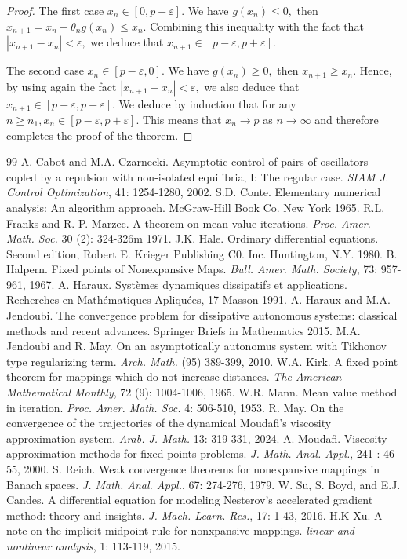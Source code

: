 \documentclass[11pt]{amsart}%
\theoremstyle{plain}
\numberwithin{equation}{section}
\begin{document}
\begin{proof}
\par\noindent The first case $x_{n}\in [0,p+\varepsilon ].$ We have $g(x_{n})\leq 0,
$ then $x_{n+1}=x_n+\theta_n g(x_n)\leq x_{n}.$ Combining this inequality with the fact that $%
\left\vert x_{n+1}-x_{n}\right\vert <\varepsilon ,$ we deduce that $%
x_{n+1}\in [p-\varepsilon ,p+\varepsilon ].$

\par\noindent The second case $x_{n}\in [p-\varepsilon ,0].$  We have $%
g(x_n)\geq 0,$ then $x_{n+1}\geq x_{n}.$ Hence, by using again the
fact $\left\vert x_{n+1}-x_{n}\right\vert <\varepsilon ,$ we also deduce
that $x_{n+1}\in [p-\varepsilon ,p+\varepsilon ].$ We deduce by induction that  for any $n\geq n_{1},x_{n}\in
[p-\varepsilon ,p+\varepsilon ].$ This means that $ x_n\rightarrow p$ as $n\rightarrow\infty$ and therefore completes the proof of the theorem.
\end{proof}
\begin{thebibliography}{99}
 A. Cabot  and  M.A. Czarnecki. Asymptotic control of pairs of oscillators copled by a repulsion with non-isolated equilibria, I: The regular case. \textit{SIAM J. Control Optimization}, 41: 1254-1280, 2002.
 S.D. Conte. Elementary numerical analysis: An algorithm approach. McGraw-Hill Book Co. New York 1965.
 R.L. Franks and R. P. Marzec. A theorem on mean-value iterations. \textit{Proc. Amer. Math. Soc.} 30 (2): 324-326m 1971.
 J.K. Hale. Ordinary differential equations. Second edition, Robert E. Krieger Publishing C0. Inc. Huntington, N.Y. 1980.
 B. Halpern. Fixed points of Nonexpansive Maps. \textit{ Bull. Amer. Math.
Society}, { 73}: 957-961, 1967.
 A. Haraux. Syst\`emes dynamiques dissipatifs et applications. Recherches en Math\'ematiques Apliqu\'ees, 17 Masson 1991.
  A. Haraux and  M.A. Jendoubi. The convergence problem for dissipative autonomous systems: classical methods and recent advances. Springer Briefs in Mathematics 2015.
 M.A. Jendoubi and  R. May. On an asymptotically autonomus system with Tikhonov type regularizing term. \textit{ Arch. Math.} (95) 389-399, 2010.
 W.A. Kirk. A fixed point theorem for mappings which do not increase distances. \textit{ The American Mathematical Monthly}, 72 (9):  1004-1006, 1965.
 W.R. Mann. Mean value method in iteration. \textit{Proc. Amer. Math. Soc.} 4: 506-510, 1953.
 R. May. On the convergence of the trajectories of the dynamical Moudafi's viscosity approximation system. \textit{Arab. J. Math.}  13: 319-331, 2024.
A. Moudafi. Viscosity approximation methods for fixed points
problems. \textit{J. Math. Anal. Appl.}, { 241} : 46-55, 2000.
 S. Reich. Weak convergence theorems for nonexpansive mappings in Banach spaces. \textit{ J. Math. Anal. Appl.}, 67: 274-276, 1979.
 W. Su, S. Boyd, and E.J. Candes. A differential equation for modeling Nesterov's accelerated gradient method: theory and insights. \textit{ J. Mach. Learn. Res.}, 17: 1-43, 2016.
 H.K Xu. A note on the implicit midpoint rule for nonxpansive mappings. \textit{linear and nonlinear analysis}, 1: 113-119, 2015.
\end{thebibliography}
\end{document}
